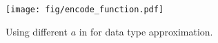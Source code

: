 \begin{figure}[t] 
    \centering 
    \texttt{[image: fig/encode\_function.pdf]}  
    \caption{Using different $a$ in \proj{} for data type approximation.}
    \label{fig:encode_function}
\end{figure}